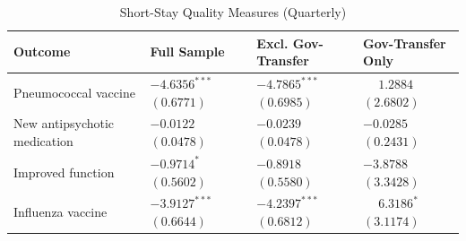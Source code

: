 \documentclass[12pt]{article}
\begin{document}
\begin{table}[H]
\centering
\caption{Short-Stay Quality Measures (Quarterly)}
\label{tab:govtransfer-short-stay}
\small
\setlength{\tabcolsep}{6pt}
\begin{tabularx}{\textwidth}{@{} l Y Y Y @{}}
\toprule
Outcome & Full Sample & Excl. Gov-Transfer & Gov-Transfer Only \\
\midrule
Pneumococcal vaccine &  &  &  \\
New antipsychotic medication &  &  &  \\
Improved function &  &  &  \\
Influenza vaccine &  &  &  \\
\bottomrule
\end{tabularx}
\end{table}
\end{document}
